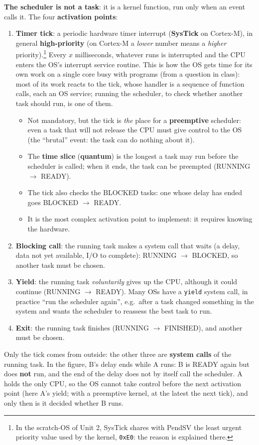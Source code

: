 \textbf{The scheduler is not a task}: it is a kernel function, run only when an event calls it. The four \textbf{activation points}:
\begin{enumerate}
    \item \textbf{Timer tick}: a periodic hardware timer interrupt (\textbf{SysTick} on Cortex-M), in general \textbf{high-priority} (on Cortex-M a \emph{lower} number means a \emph{higher} priority).\footnote{In the scratch-OS of Unit 2, SysTick shares with PendSV the least urgent priority value used by the kernel, \texttt{0xE0}: the reason is explained there.} Every $x$ milliseconds, whatever runs is interrupted and the CPU enters the OS's interrupt service routine. This is how the OS gets time for its own work on a single core busy with programs (from a question in class): most of its work reacts to the tick, whose handler is a sequence of function calls, each an OS service; running the scheduler, to check whether another task should run, is one of them.
    \begin{itemize}
        \item Not mandatory, but the tick is \emph{the} place for a \textbf{preemptive} scheduler: even a task that will not release the CPU must give control to the OS (the ``brutal'' event: the task can do nothing about it).
        \item The \textbf{time slice} (\textbf{quantum}) is the longest a task may run before the scheduler is called; when it ends, the task can be preempted (RUNNING $\to$ READY).
        \item The tick also checks the BLOCKED tasks: one whose delay has ended goes BLOCKED $\to$ READY.
        \item It is the most complex activation point to implement: it requires knowing the hardware.
    \end{itemize}
    \item \textbf{Blocking call}: the running task makes a system call that waits (a delay, data not yet available, I/O to complete): RUNNING $\to$ BLOCKED, so another task must be chosen.
    \item \textbf{Yield}: the running task \emph{voluntarily} gives up the CPU, although it could continue (RUNNING $\to$ READY). Many OSs have a \texttt{yield} system call, in practice ``run the scheduler again'', e.g.\ after a task changed something in the system and wants the scheduler to reassess the best task to run.
    \item \textbf{Exit}: the running task finishes (RUNNING $\to$ FINISHED), and another must be chosen.
\end{enumerate}
Only the tick comes from outside: the other three are \textbf{system calls} of the running task. In the figure, B's delay ends while A runs: B is READY again but does \textbf{not} run, and the end of the delay does not by itself call the scheduler. A holds the only CPU, so the OS cannot take control before the next activation point (here A's yield; with a preemptive kernel, at the latest the next tick), and only then is it decided whether B runs.

